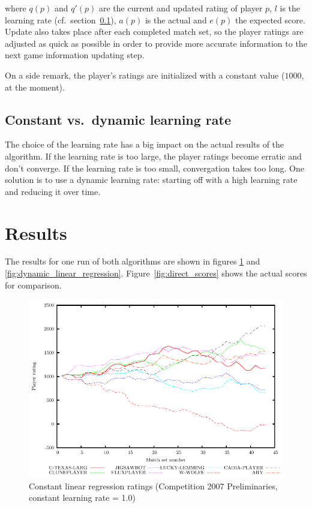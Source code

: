 \documentclass[a4paper,10pt]{article}
\begin{document}
where $q(p)$ and $q'(p)$ are the current and updated rating of player $p$, $l$ is the learning rate (cf.\ section~\ref{sec:constant_dynamic}), $a(p)$ is the actual and $e(p)$ the expected score. Update also takes place after each completed match set, so the player ratings are adjusted as quick as possible in order to provide more accurate information to the next game information updating step.

On a side remark, the player's ratings are initialized with a constant value ($1000$, at the moment).


\subsection{Constant vs.\ dynamic learning rate}
\label{sec:constant_dynamic}

The choice of the learning rate has a big impact on the actual results of the algorithm. If the learning rate is too large, the player ratings become erratic and don't converge. If the learning rate is too small, convergation takes too long. One solution is to use a dynamic learning rate: starting off with a high learning rate and reducing it over time.

\section{Results}

The results for one run of both algorithms are shown in figures \ref{fig:constant_linear_regression} and \ref{fig:dynamic_linear_regression}. Figure~\ref{fig:direct_scores} shows the actual scores for comparison.

\begin{figure}
 \centering
 \includegraphics[width=\textwidth]{constant_linear_regression_1_0}
 \caption{Constant linear regression ratings (Competition 2007 Preliminaries, constant learning rate = 1.0)}
 \label{fig:constant_linear_regression}
\end{figure}
\end{document}

